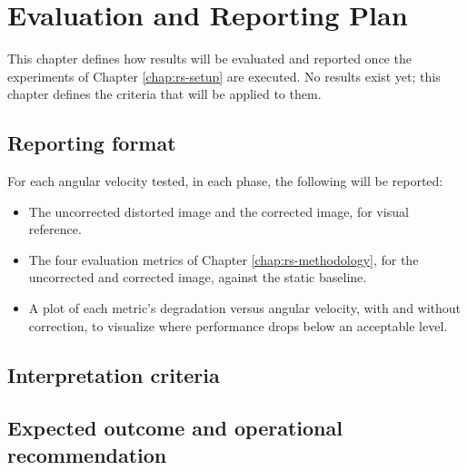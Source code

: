 \chapter{Evaluation and Reporting Plan}
\label{chap:rs-results}

This chapter defines how results will be evaluated and reported once the experiments of Chapter \ref{chap:rs-setup} are executed. No results exist yet; this chapter defines the criteria that will be applied to them.

\section{Reporting format}

For each angular velocity tested, in each phase, the following will be reported:

\begin{itemize}
    \item The uncorrected distorted image and the corrected image, for visual reference.
    \item The four evaluation metrics of Chapter \ref{chap:rs-methodology}, for the uncorrected and corrected image, against the static baseline.
    \item A plot of each metric's degradation versus angular velocity, with and without correction, to visualize where performance drops below an acceptable level.
\end{itemize}

\section{Interpretation criteria}


\section{Expected outcome and operational recommendation}

